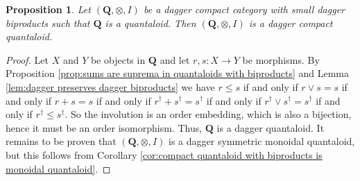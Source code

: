 \documentclass[12pt]{tac}
\newtheorem{proposition}[theorem]{Proposition}
\theoremstyle{definition}
\theoremstyle{remark}
\newcommand{\<}{\langle}
\renewcommand{\>}{\rangle}
\renewcommand{\:}{\colon}
\begin{document}
\begin{proposition}\label{prop:dagger-compact quantaloid with dagger biproducts is dagger symmetric monoidal quantaloid}
    Let $(\mathbf Q,\otimes,I)$ be a dagger compact category with small dagger biproducts such that $\mathbf Q$ is a quantaloid. Then $(\mathbf Q,\otimes, I)$ is a dagger compact quantaloid. 
\end{proposition}
\begin{proof}
Let $X$ and $Y$ be objects in $\mathbf Q$ and let $r,s:X\to Y$ be morphisms. By Proposition \ref{prop:sums are suprema in quantaloids with biproducts} and Lemma \ref{lem:dagger preserves dagger biproducts} we have $r\leq s$ if and only if $r\vee s=s$ if and only if $r+s=s$ if and only if $r^\dag+s^\dag=s^\dag$ if and only if $r^\dag\vee s^\dag=s^\dag$ if and only if $r^\dag\leq s^\dag$. So the involution is an order embedding, which is also a bijection, hence it must be an order isomorphism. Thus,   $\mathbf Q$ is a dagger quantaloid. It remains to be proven that $(\mathbf Q,\otimes,I)$ is a dagger symmetric monoidal quantaloid, but this follows from Corollary \ref{cor:compact quantaloid with biproducts is monoidal quantaloid}.
\end{proof}
\end{document}
